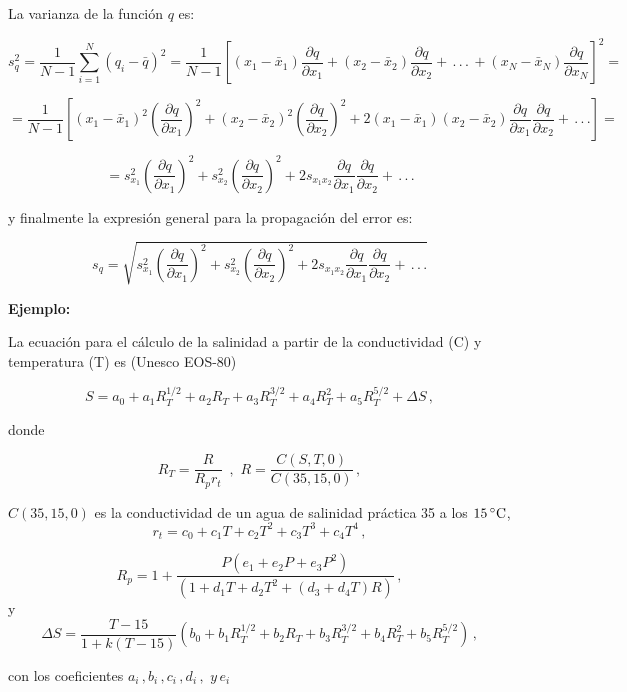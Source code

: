 \documentclass[
]{agujournal2019}
\begin{document}
La varianza de la función \(q\) es:

\[s^2_q=\frac{1}{N-1}\sum\limits^N_{i=1}\left( q_i-\bar{q} \right)^2=
               \frac{1}{N-1}\left[
               \left(x_1 - \bar{x}_1\right)\frac{\partial{q}}{\partial{x_1}} +
               \left(x_2 - \bar{x}_2\right)\frac{\partial{q}}{\partial{x_2}} +
              \,.\,.\,.\, +
               \left(x_N - \bar{x}_N\right)\frac{\partial{q}}{\partial{x_N}}
               \right]^2=\]

\[=\frac{1}{N-1}\left[
\left(x_1 - \bar{x}_1\right)^2\left(\frac{\partial{q}}{\partial{x_1}}\right)^2 +
\left(x_2 - \bar{x}_2\right)^2\left(\frac{\partial{q}}{\partial{x_2}}\right)^2 +
2\left(x_1 - \bar{x}_1\right)\left(x_2 - \bar{x}_2\right)
\frac{\partial{q}}{\partial{x_1}}\frac{\partial{q}}{\partial{x_2}}+\,.\,.\,.\right]=\]

\[=s^2_{x_1}\left(\frac{\partial{q}}{\partial{x_1}}\right)^2 +
   s^2_{x_2}\left(\frac{\partial{q}}{\partial{x_2}}\right)^2+
   2 s_{{x_1}{x_2}}
   \frac{\partial{q}}{\partial{x_1}}\frac{\partial{q}}{\partial{x_2}}+\,.\,.\,.\]

y finalmente la expresión general para la propagación del error es:

\[s_{q}=\sqrt{s^2_{x_1}\left(\frac{\partial{q}}{\partial{x_1}}\right)^2 +
               s^2_{x_2}\left(\frac{\partial{q}}{\partial{x_2}}\right)^2+
                2 s_{{x_1}{x_2}}
                \frac{\partial{q}}{\partial{x_1}}\frac{\partial{q}}{\partial{x_2}}+\,.\,.\,.}\]

\vspace{0.5cm}

\textbf{Ejemplo:}

\noindent La ecuación para el cálculo de la salinidad a partir de la
conductividad (C) y temperatura (T) es (Unesco EOS-80)

\[S=a_0+a_1 R_T^{1/2}+a_2 R_T+a_3 R_T^{3/2}+a_4 R_T^{2}+a_5 R_T^{5/2}+\Delta{S}\,,\]

donde

\[R_T=\frac{R}{R_p r_t}\,\,\,,\,\,R=\frac{C(S,T,0)}{C(35,15,0)}\,,\]

\(C(35,15,0)\) es la conductividad de un agua de salinidad práctica 35 a
los \(15\,^\circ{\rm C}\),
\[r_t=c_0 + c_1 T + c_2 T^2 + c_3T^3 + c_4T^4\,,\]

\[R_p=1+\frac{P(e_1+e_2P+e_3P^2)}{(1+d_1T+d_2T^2+(d_3 + d_4T)R)}\,,\] y
\[\Delta{S}=\frac{T-15}{1+k(T-15)}(b_0+b_1 R_T^{1/2}+b_2 R_T+b_3 R_T^{3/2}+b_4 R_T^{2}+b_5 R_T^{5/2})\,,\]

con los coeficientes \(a_i\,,b_i\,,c_i\,,d_i\,,\,\,y\,e_i\)~
\end{document}

